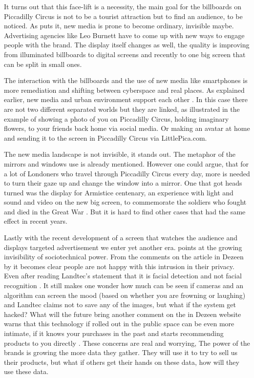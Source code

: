 \documentclass[a4paper, 11pt]{article}
\begin{document}
It turns out that this face-lift is a necessity, the main goal for the billboards on Piccadilly Circus is not to be a tourist attraction but to find an audience, to be noticed. As \cite{Graham} puts it, new media is prone to become ordinary, invisible maybe. Advertising agencies like Leo Burnett have to come up with new ways to engage people with the brand. The display itself changes as well, the quality is improving from illuminated billboards to digital screens and recently to one big screen that can be split in small ones.

The interaction with the billboards and the use of new media like smartphones is more remediation and shifting between cyberspace and real places. As explained earlier, new media and urban environment support each other \citep{Graham}. In this case there are not two different separated worlds but they are linked, as illustrated in the example of showing a photo of you on Piccadilly Circus, holding imaginary flowers, to your friends back home via social media. Or making an avatar at home and sending it to the screen in Piccadilly Circus via LittlePica.com. 

The new media landscape is not invisible, it stands out. The metaphor of the mirrors and windows \cite{bolter2003} use is already mentioned. However one could argue, that for a lot of Londoners who travel through Piccadilly Circus every day, more is needed to turn their gaze up and change the window into a mirror. One that got heads turned was the display for Armistice centenary, an experience with light and sound and video on the new big screen, to commemorate the soldiers who fought and died in the Great War \citep{drum}. But it is hard to find other cases that had the same effect in recent years. 

Lastly with the recent development of a screen that watches the audience and displays targeted advertisement we enter yet another era. \cite{Graham} points at the growing invisibility of sociotechnical power. From the comments on the article in Dezeen by \cite{dezeen} it becomes clear people are not happy with this intrusion in their privacy.
Even after reading Landtec's statement that it is facial detection and not facial recognition \citep{landtec}. It still makes one wonder how much can be seen if cameras and an algorithm can screen the mood (based on whether you are frowning or laughing) and Landtec claims not to save any of the images, but what if the system get hacked? 
What will the future bring another comment on the in Dezeen website warns that this technology if rolled out in the public space can be even more intimate, if it knows your purchases in the past and starts recommending products to you directly \citep{dezeen}.
These concerns are real and worrying, The power of the brands is growing the more data they gather. They will use it to try to sell us their products, but what if others get their hands on these data, how will they use these data.
\end{document}
